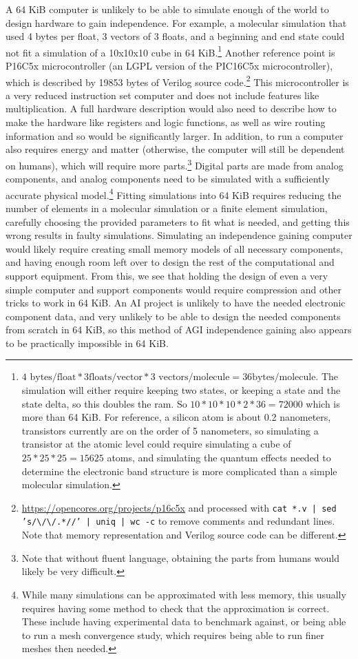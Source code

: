 \documentclass[letterpaper,twocolumn]{article}
\begin{document}
A 64 KiB computer is unlikely to be able to simulate enough of the
world to design hardware to gain independence. For example, a
molecular simulation that used 4 bytes per float, 3 vectors of 3
floats, and a beginning and end state could not fit a simulation of a
10x10x10 cube in 64 KiB.\footnote{$4 \text{ bytes/float} * 3 \text{
  floats/vector} * 3 \text{ vectors/molecule} = 36 \text{
  bytes/molecule}$. The simulation will either require keeping two
states, or keeping a state and the state delta, so this doubles the
ram. So $10*10*10*2*36=72000$ which is more than 64 KiB. For
reference, a silicon atom is about 0.2 nanometers, transistors
currently are on the order of 5 nanometers, so simulating a transistor
at the atomic level could require simulating a cube of
$25*25*25=15625$ atoms, and simulating the quantum effects needed to
determine the electronic band structure is more complicated than a
simple molecular simulation.}  Another reference point is P16C5x
microcontroller (an LGPL version of the PIC16C5x microcontroller),
which is described by 19853 bytes of Verilog source
code.\footnote{\url{https://opencores.org/projects/p16c5x} and
processed with
{\texttt{cat *.v | sed 's/\textbackslash/\textbackslash/.*//' | uniq | wc -c}} to
remove comments and redundant lines. Note that memory representation
and Verilog source code can be different.} This microcontroller is a
very reduced instruction set computer and does not include features
like multiplication. A full hardware description would also need to
describe how to make the hardware like registers and logic functions,
as well as wire routing information and so would be significantly
larger. In addition, to run a computer also requires energy and matter
(otherwise, the computer will still be dependent on humans), which
will require more parts.\footnote{Note that without fluent language,
obtaining the parts from humans would likely be very difficult.}
Digital parts are made from analog components, and analog components
need to be simulated with a sufficiently accurate physical
model.\footnote{While many simulations can be approximated with less
memory, this usually requires having some method to check that the
approximation is correct. These include having experimental data to
benchmark against, or being able to run a mesh convergence study,
which requires being able to run finer meshes then needed.} Fitting
simulations into 64 KiB requires reducing the number of elements in a
molecular simulation or a finite element simulation, carefully
choosing the provided parameters to fit what is needed, and getting
this wrong results in faulty simulations. Simulating an independence
gaining computer would likely require creating small memory models of
all necessary components, and having enough room left over to design
the rest of the computational and support equipment. From this, we see
that holding the design of even a very simple computer and support
components would require compression and other tricks to work in 64
KiB. An AI project is unlikely to have the needed electronic component
data, and very unlikely to be able to design the needed components
from scratch in 64 KiB, so this method of AGI independence gaining
also appears to be practically impossible in 64 KiB.
\end{document}
